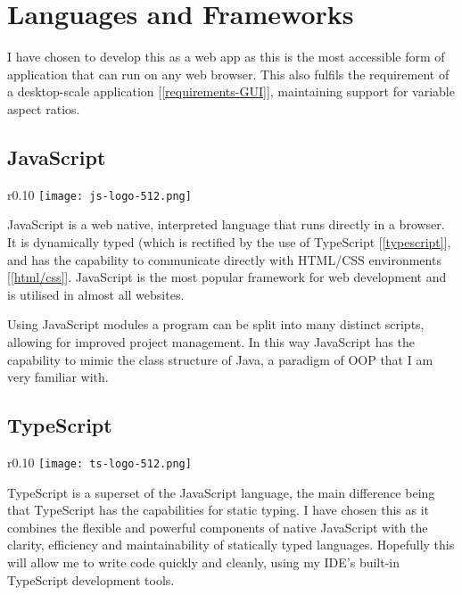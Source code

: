 \section{Languages and Frameworks}

    I have chosen to develop this as a web app as this is the most accessible form of application that can run on any web browser. This also fulfils the requirement of a desktop-scale application [\autoref{requirements-GUI}], maintaining support for variable aspect ratios.

    \subsection{JavaScript}

        \begin{wrapfigure}{r}{0.10\textwidth}
            \centering
            \texttt{[image: js-logo-512.png]}
        \end{wrapfigure}

        JavaScript is a web native, interpreted language that runs directly in a browser. It is dynamically typed (which is rectified by the use of TypeScript [\autoref{typescript}], and has the capability to communicate directly with HTML/CSS environments [\autoref{html/css}]. JavaScript is the most popular framework for web development and is utilised in almost all websites.

        Using JavaScript modules a program can be split into many distinct scripts, allowing for improved project management. In this way JavaScript has the capability to mimic the class structure of Java, a paradigm of OOP that I am very familiar with.

    \subsection{TypeScript}
    \label{typescript}

        \begin{wrapfigure}{r}{0.10\textwidth}
            \centering
            \texttt{[image: ts-logo-512.png]}
        \end{wrapfigure}

        TypeScript \cite{typescript} is a superset of the JavaScript language, the main difference being that TypeScript has the capabilities for static typing. I have chosen this as it combines the flexible and powerful components of native JavaScript with the clarity, efficiency and maintainability of statically typed languages. Hopefully this will allow me to write code quickly and cleanly, using my IDE's built-in TypeScript development tools.


